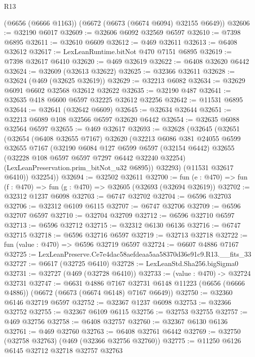 \begin{lexlean}{R13}
\begin{coremodule}
    (@6656 (@6666 @1163))
    (@6672 (@6673 (@6674 @6094) @32155 @6649))
@32606 := @32190 @6017
@32609 := @32606 @6092 @32569 @6597
@32610 := @7398 @6895
@32611 := @32610 @6609
@32612 := @469 @32611
@32613 := @6408 @32612
@32617 := LexLeanRuntime.bitNot @470 @7151 @6895
@32619 := @7398 @32617 @6410
@32620 := @469 @32619
@32622 := @6408 @32620 @6442
@32624 := @32609 (@32613 @32622)
@32625 := @32366 @32611
@32628 := @32624 (@469 (@32625 @32619))
@32629 := @32213 @6082
@32634 := @32629 @6091 @6602 @32568 @32612 @32622
@32635 := @32190 @487
@32641 := @32635 @418 @6600 @6597 @32225 @32612 @32256
@32642 := @11531 @6895
@32644 := @32641 (@32642 @6609)
@32645 := @32634 @32644
@32651 := @32213 @6089 @108 @32566 @6597 @32620 @6442
@32654 := @32635 @6088 @32564 @6597
@32655 := @469 @32617
@32693 := @32628
    (@32645
      (@32651
        (@32654
          (@6408 @32655 @7167)
          @32620
          (@32213
            @6086
            @381
            @24055
            @6599
            @32655
            @7167
            (@32190
              @6084
              @127
              @6599
              @6597
              (@32154 @6442)
              @32655
              (@32228 @108 @6597 @6597 @7297 @6442 @32240 @32254)
              (LexLeanPreservation.prim_bitNot_u32 @6895))
            @32293)
          (@11531 @32617 @6410))
        @32254))
@32694 := @32502 @32611
@32700 := fun (e : @470) => fun (f : @470) => fun (g : @470) => @32605 (@32693 (@32694 @32619))
@32702 := @32312 @1237 @6098
@32703 := @6747 @32702
@32704 := @6596 @32703
@32706 := @32312 @6109 @6115
@32707 := @6747 @32706
@32709 := @6596 @32707 @6597
@32710 := @32704 @32709
@32712 := @6596 @32710 @6597
@32713 := @6596 @32712
@32715 := @32312 @6130 @6136
@32716 := @6747 @32715
@32718 := @6596 @32716 @6597
@32719 := @32713 @32718
@32722 := fun (value : @470) => @6596 @32719 @6597
@32724 := @6607 @4886 @7167
@32725 := LexLeanPreserve.Ce7e4dac58aefdeaa5aa58370d36e91c9.R13.__fits_33
@32727 := @6617 (@32725 @6410)
@32728 := LexLeanStd.Sha256.bigSigma0
@32731 := @32727 (@469 (@32728 @6410))
@32733 := (value : @470) -> @32724 @32731
@32747 := @6631
    @4886
    @7167
    @32731
    @6148
    @11223
    (@6656 (@6666 @4886))
    (@6672 (@6673 (@6674 @6148) @7167 @6649))
@32750 := @32360 @6146 @32719 @6597
@32752 := @32367 @1237 @6098
@32753 := @32366 @32752
@32755 := @32367 @6109 @6115
@32756 := @32753 @32755
@32757 := @469 @32756
@32758 := @6408 @32757
@32760 := @32367 @6130 @6136
@32761 := @469 @32760
@32763 := @6408 @32761 @6442
@32769 := @32750 (@32758 @32763) (@469 (@32366 @32756 @32760))
@32775 := @11250 @6126 @6145 @32712 @32718 @32757 @32763

\end{coremodule}
\end{lexlean}

